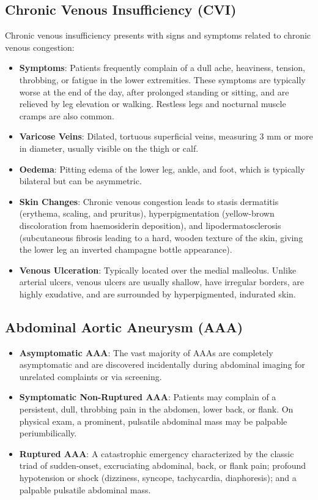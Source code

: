 \subsection*{Chronic Venous Insufficiency (CVI)}
Chronic venous insufficiency presents with signs and symptoms related to chronic venous congestion:
\begin{itemize}
    \item \textbf{Symptoms}: Patients frequently complain of a dull ache, heaviness, tension, throbbing, or fatigue in the lower extremities. These symptoms are typically worse at the end of the day, after prolonged standing or sitting, and are relieved by leg elevation or walking. Restless legs and nocturnal muscle cramps are also common.
    \item \textbf{Varicose Veins}: Dilated, tortuous superficial veins, measuring 3 mm or more in diameter, usually visible on the thigh or calf.
    \item \textbf{Oedema}: Pitting edema of the lower leg, ankle, and foot, which is typically bilateral but can be asymmetric.
    \item \textbf{Skin Changes}: Chronic venous congestion leads to stasis dermatitis (erythema, scaling, and pruritus), hyperpigmentation (yellow-brown discoloration from haemosiderin deposition), and lipodermatosclerosis (subcutaneous fibrosis leading to a hard, wooden texture of the skin, giving the lower leg an inverted champagne bottle appearance).
    \item \textbf{Venous Ulceration}: Typically located over the medial malleolus. Unlike arterial ulcers, venous ulcers are usually shallow, have irregular borders, are highly exudative, and are surrounded by hyperpigmented, indurated skin.
\end{itemize}

\subsection*{Abdominal Aortic Aneurysm (AAA)}
\begin{itemize}
    \item \textbf{Asymptomatic AAA}: The vast majority of AAAs are completely asymptomatic and are discovered incidentally during abdominal imaging for unrelated complaints or via screening.
    \item \textbf{Symptomatic Non-Ruptured AAA}: Patients may complain of a persistent, dull, throbbing pain in the abdomen, lower back, or flank. On physical exam, a prominent, pulsatile abdominal mass may be palpable periumbilically.
    \item \textbf{Ruptured AAA}: A catastrophic emergency characterized by the classic triad of sudden-onset, excruciating abdominal, back, or flank pain; profound hypotension or shock (dizziness, syncope, tachycardia, diaphoresis); and a palpable pulsatile abdominal mass.
\end{itemize}


